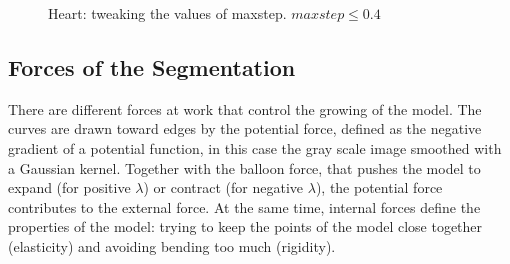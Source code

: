 \begin{figure}[!hbt]
\centering   
{}
\caption{Heart: tweaking the values of maxstep. $maxstep \leq 0.4$}
\label{fig:max_leq}
\end{figure}

\subsection{Forces of the Segmentation}
\label{sub:forces}

There are different forces at work that control the growing of the model. The curves are drawn toward edges by the potential force, defined as the negative gradient of a potential function, in this case the gray scale image smoothed with a Gaussian kernel. Together with the balloon force, that pushes the model to expand (for positive $\lambda$) or contract (for negative $\lambda$), the potential force contributes to the external force. At the same time, internal forces define the properties of the model: trying to keep the points of the model close together (elasticity) and avoiding bending too much (rigidity). 


